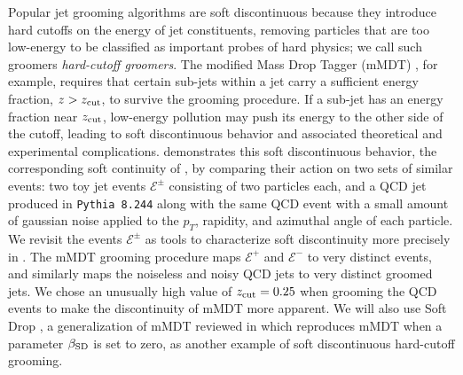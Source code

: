 Popular jet grooming algorithms are soft discontinuous because they introduce hard cutoffs on the energy of jet constituents, removing particles that are too low-energy to be classified as important probes of hard physics;
%
we call such groomers \textit{hard-cutoff groomers}.
%
The modified Mass Drop Tagger (mMDT) \cite{Dasgupta:2013ihk}, for example, requires that certain sub-jets within a jet carry a sufficient energy fraction, \(z > z_{\rm cut}\), to survive the grooming procedure.
%
If a sub-jet has an energy fraction near \(z_{\rm cut}\), low-energy pollution may push its energy to the other side of the cutoff, leading to soft discontinuous behavior and associated theoretical and experimental complications.
%
 demonstrates this soft discontinuous behavior, the corresponding soft continuity of , by comparing their action on two sets of similar events:
%
two toy jet events \(\mathcal{E}^\pm\) consisting of two particles each, and a QCD jet produced in \texttt{Pythia 8.244} along with the same QCD event with a small amount of gaussian noise applied to the \(p_T\), rapidity, and azimuthal angle of each particle.
%
We revisit the events \(\mathcal{E}^\pm\) as tools to characterize soft discontinuity more precisely in .
%
The mMDT grooming procedure maps \(\mathcal{E}^+\) and \(\mathcal{E}^-\) to very distinct events, and similarly maps the noiseless and noisy QCD jets to very distinct groomed jets.
%
We chose an unusually high value of \(z_{\rm cut} = 0.25\) when grooming the QCD events to make the discontinuity of mMDT more apparent.
%
We will also use Soft Drop \cite{Larkoski:2014wba}, a generalization of mMDT reviewed in  which reproduces mMDT when a parameter \(\beta_{\rm SD}\) is set to zero, as another example of soft discontinuous hard-cutoff grooming.


